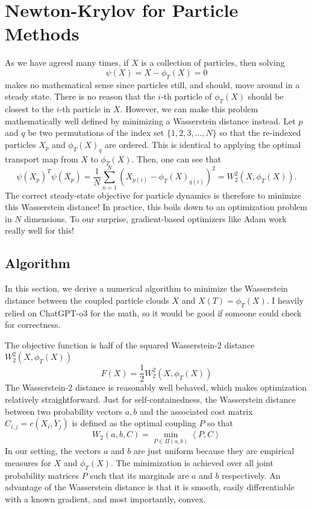 \documentclass{article}
\begin{document}
\section{Newton-Krylov for Particle Methods}
As we have agreed many times, if $X$ is a collection of particles, then solving
\begin{equation}
    \psi(X) = X - \phi_T(X) = 0
\end{equation}
makes no mathematical sense since particles still, and should, move around in a steady state. There is no reason that the $i$-th particle of $\phi_T(X)$ should be closest to the $i$-th particle in $X$. However, we can make this problem mathematically well defined by minimizing a Wasserstein distance instead. Let $p$ and $q$ be two permutations of the index set $\{1,2,3,\dots,N\}$ so that the re-indexed particles $X_p$ and $\phi_T(X)_q$ are ordered. This is identical to applying the optimal transport map from $X$ to $\phi_T(X)$. Then, one can see that
\begin{equation}
    \psi(X_p)^T \psi(X_p)= \frac{1}{N} \sum_{n=1}^N (X_{p(i)} - \phi_T(X)_{q(i)})^2 = W^2_2(X, \phi_T(X)).
\end{equation}
The correct steady-state objective for particle dynamics is therefore to minimize this Wasserstein distance! In practice, this boils down to an optimization problem in $N$ dimensions. To our surprise, gradient-based optimizers like Adam work really well for this!

\subsection{Algorithm} \label{subsec:particle_algorithm}
In this section, we derive a numerical algorithm to minimize the Wasserstein distance between the coupled particle clouds $X$ and $X(T) = \phi_T(X)$. I heavily relied on ChatGPT-o3 for the math, so it would be good if someone could check for correctness.

The objective function is half of the squared Wasserstein-2 distance $W_2^2(X, \phi_T(X))$
\begin{equation}
    F(X) = \frac{1}{2}W_2^2(X, \phi_T(X))
\end{equation}
The Wasserstein-2 distance is reasonably well behaved, which makes optimization relatively straightforward. Just for self-containedness, the Wasserstein distance between two probability vectors $a, b$ and the associated cost matrix $C_{i,j} = c(X_i, Y_j)$ is defined as the optimal coupling $P$ so that
\begin{equation} \label{eq:regularized_OT_loss}
    W_2(a, b, C) = \underset{P \in \Pi(a,b)}{\min} \left\langle P, C\right\rangle
\end{equation}
In our setting, the vectors $a$ and $b$ are just uniform because they are empirical measures for $X$ and $\phi_T(X)$. The minimization is achieved over all joint probability matrices $P$ such that its marginals are $a$ and $b$ respectively. An advantage of the Wasserstein distance is that it is smooth, easily differentiable with a known gradient, and most importantly, convex.
\end{document}
